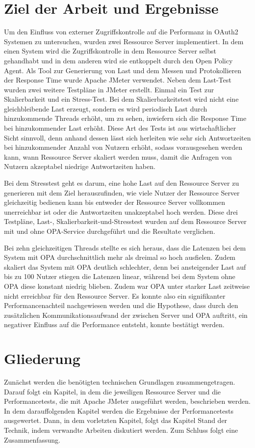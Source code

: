 \section{Ziel der Arbeit und Ergebnisse}
\label{sec:intro:goal}
Um den Einfluss von externer Zugriffskontrolle auf die Performanz in OAuth2 Systemen zu untersuchen, wurden zwei Ressource Server implementiert. In dem einen System wird die Zugriffskontrolle in dem Ressource Server selbst gehandhabt und in dem anderen wird sie entkoppelt durch den Open Policy Agent. 
Als Tool zur Generierung von Last und dem Messen und Protokollieren der Response Time wurde Apache JMeter verwendet. Neben dem Last-Test wurden zwei weitere Testpläne in JMeter erstellt. Einmal ein Test zur Skalierbarkeit und ein Stress-Test. Bei dem Skalierbarkeitstest wird nicht eine gleichbleibende Last erzeugt, sondern es wird periodisch Last durch hinzukommende Threads erhöht, um zu sehen, inwiefern sich die Response Time bei hinzukommender Last erhöht. Diese Art des Tests ist aus wirtschaftlicher Sicht sinnvoll, denn anhand dessen lässt sich herleiten wie sehr sich Antwortzeiten bei hinzukommender Anzahl von Nutzern erhöht, sodass vorausgesehen werden kann, wann Ressource Server skaliert werden muss, damit die Anfragen von Nutzern akzeptabel niedrige Antwortzeiten haben. \smallskip

Bei dem Stresstest geht es darum, eine hohe Last auf den Ressource Server zu generieren mit dem Ziel herauszufinden, wie viele Nutzer der Ressource Server gleichzeitig bedienen kann bis entweder der Ressource Server vollkommen unerreichbar ist oder die Antwortzeiten unakzeptabel hoch werden. Diese drei Testpläne, Last-, Skalierbarkeit-und-Stresstest wurden auf dem Ressource Server mit und ohne OPA-Service durchgeführt und die Resultate verglichen.\smallskip

Bei zehn gleichzeitigen Threads stellte es sich heraus, dass die Latenzen bei dem System mit OPA durchschnittlich mehr als dreimal so hoch ausfielen. Zudem skaliert das System mit \ac*{OPA} deutlich schlechter, denn bei ansteigender Last auf bis zu 100 Nutzer stiegen die Latenzen linear, während bei dem System ohne OPA diese konstant niedrig blieben. Zudem war \ac*{OPA} unter starker Last zeitweise nicht erreichbar für den Ressource Server. Es konnte also ein signifikanter Performancenachteil nachgewiesen werden und die Hypothese, dass durch den zusätzlichen Kommunikationsaufwand der zwischen Server und \ac*{OPA} auftritt, ein negativer Einfluss auf die Performance entsteht, konnte bestätigt werden.

%
%
\section{Gliederung}
\label{sec:intro:structure}
Zunächst werden die benötigten technischen Grundlagen zusammengetragen. Darauf folgt ein Kapitel, in dem die jeweiligen Ressource Server und die Performancetests, die mit Apache JMeter ausgeführt werden, beschrieben werden. In dem darauffolgenden Kapitel werden die Ergebnisse der Performancetests ausgewertet. Dann, in dem vorletzten Kapitel, folgt das Kapitel Stand der Technik, indem verwandte Arbeiten diskutiert werden. Zum Schluss folgt eine Zusammenfassung. 
